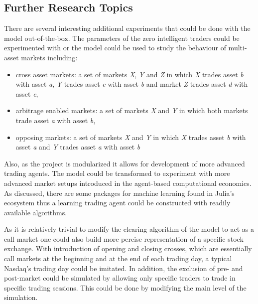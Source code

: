 \subsection{Further Research Topics}
There are several interesting additional experiments that could be done with
the model out-of-the-box. The parameters of the zero intelligent traders could
be experimented with or the model could be used to study the behaviour of 
multi-asset markets including:
\begin{itemize}
    \item cross asset markets: a set of markets \emph{X}, \emph{Y} and \emph{Z} 
        in which \emph{X} trades asset \emph{b} with asset \emph{a}, 
        \emph{Y} trades asset \emph{c} with asset \emph{b} 
        and market \emph{Z} trades asset \emph{d} with asset \emph{c},
    \item arbitrage enabled markets: a set of markets \emph{X} and \emph{Y} 
        in which both markets trade asset \emph{a} with asset \emph{b},
    \item opposing markets: a set of markets \emph{X} and \emph{Y} 
        in which \emph{X} trades asset \emph{b} with asset \emph{a} 
        and \emph{Y} trades asset \emph{a} with asset \emph{b}
\end{itemize}

Also, as the project is modularized it allows for development of more advanced
trading agents. The model could be transformed to experiment with more advanced
market setups introduced in the agent-based computational economics. As discussed,
there are some packages for machine learning found in Julia's ecosystem thus 
a learning trading agent could be constructed with readily available algorithms.

As it is relatively trivial to modify the clearing algorithm of the model to 
act as a call market one could also build more percise representation of a
specific stock exchange. With introduction of opening and closing crosses,
which are essentially call markets at the beginning and at the end of each 
trading day, a typical Nasdaq's trading day could be imitated. In addition,
the exclusion of pre- and post-market could be simulated by allowing only
specific traders to trade in specific trading sessions. This could be done
by modifying the main level of the simulation. 

